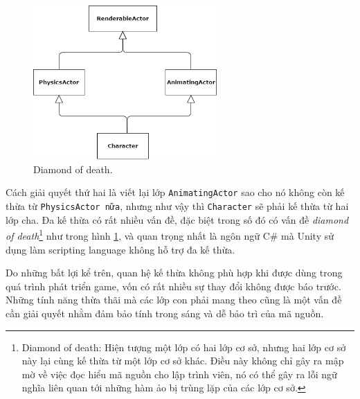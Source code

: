 \documentclass[12pt]{report}
\begin{document}
\begin{figure}[H]
  \centering
    \includegraphics[width=7cm]{Pics/Chap4/multipleinheritance.png}
  \caption{Diamond of death.} 
  \label{fig:multipleinheritance}
\end{figure}
Cách giải quyết thứ hai là viết lại lớp \texttt{AnimatingActor} sao cho nó không còn kế thừa từ \texttt{PhysicsActor nữa}, nhưng như vậy thì \texttt{Character} sẽ phải kế thừa từ hai lớp cha. Đa kế thừa có rất nhiều vấn đề, đặc biệt trong số đó có vấn đề \textit{diamond of death}\footnote{Diamond of death: Hiện tượng một lớp có hai lớp cơ sở, nhưng hai lớp cơ sở này lại cùng kế thừa từ một lớp cơ sở khác. Điều này không chỉ gây ra mập mờ về việc đọc hiểu mã nguồn cho lập trình viên, nó có thể gây ra lỗi ngữ nghĩa liên quan tới những hàm ảo bị trùng lặp của các lớp cơ sở.} như trong hình \ref{fig:multipleinheritance}, và quan trọng nhất là ngôn ngữ C\# mà Unity sử dụng làm scripting language không hỗ trợ đa kế thừa.

Do những bất lợi kể trên, quan hệ kế thừa không phù hợp khi được dùng trong quá trình phát triển game, vốn có rất nhiều sự thay đổi không được báo trước. Những tính năng thừa thãi mà các lớp con phải mang theo cũng là một vấn đề cần giải quyết nhằm đảm bảo tính trong sáng và dễ bảo trì của mã nguồn.
\end{document}
